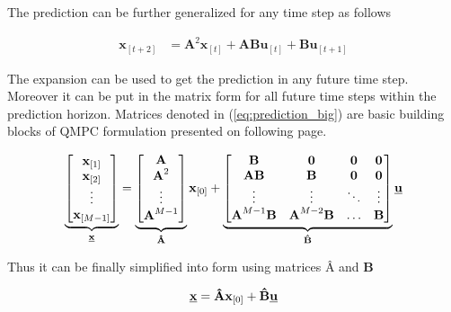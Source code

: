 The prediction can be further generalized for any time step as follows

\begin{equation}
\begin{split}
\textbf{x}_{[t+2]} &= \textbf{A}^2\textbf{x}_{[t]} + \textbf{A}\textbf{B}\textbf{u}_{[t]} + \textbf{B}\textbf{u}_{[t+1]}
\end{split}
\end{equation}

The expansion can be used to get the prediction in any future time step.  Moreover it can be put in the matrix form for all future time steps within the prediction horizon. Matrices denoted in (\ref{eq:prediction_big}) are basic building blocks of QMPC formulation presented on following page.

\begin{equation}
\label{eq:prediction_big}
\underbrace{
\begin{bmatrix}
\textbf{x}_{[1]} \\
\textbf{x}_{[2]} \\
\vdots \\
\textbf{x}_{[M-1]} \\
\end{bmatrix}}_{\textbf{\underline{x}}}
=
\underbrace{
\begin{bmatrix}
\textbf{A} \\
\textbf{A}^2 \\
\vdots \\
\textbf{A}^{M-1} \\
\end{bmatrix}}_{\textbf{\^A}}
\textbf{x}_{[0]}
+
\underbrace{
\begin{bmatrix}
\textbf{B} & \textbf{0} & \textbf{0} & \textbf{0} \\
\textbf{AB} & \textbf{B} & \textbf{0} & \textbf{0} \\
\vdots & \vdots & \ddots & \vdots \\
\textbf{A}^{M-1}\textbf{B} & \textbf{A}^{M-2}\textbf{B} & \hdots & \textbf{B}
\end{bmatrix}
}_{\textbf{\^B}}\underline{\textbf{u}}
\end{equation}

Thus it can be finally simplified into form using matrices $\textbf{\^A}$ and $\textbf{\^B}$

\begin{equation}
\textbf{\underline{x}} = \textbf{\^A}\textbf{x}_{[0]} + \textbf{\^B}\textbf{\underline{u}}
\label{eq:prediction_final}
\end{equation}

